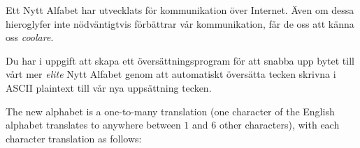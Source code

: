 

Ett Nytt Alfabet har utvecklats för kommunikation över Internet. Även om dessa hieroglyfer inte nödväntigtvis 
förbättrar vår kommunikation, får de oss att känna oss \emph{coolare}.

Du har i uppgift att skapa ett översättningsprogram för att snabba upp bytet till vårt mer \emph{elite}
Nytt Alfabet genom att automatiskt översätta tecken skrivna i ASCII plaintext till vår nya uppsättning tecken.

The new alphabet is a one-to-many translation (one character of the English alphabet translates to anywhere between $1$ and $6$ other characters), with each character translation as follows:

